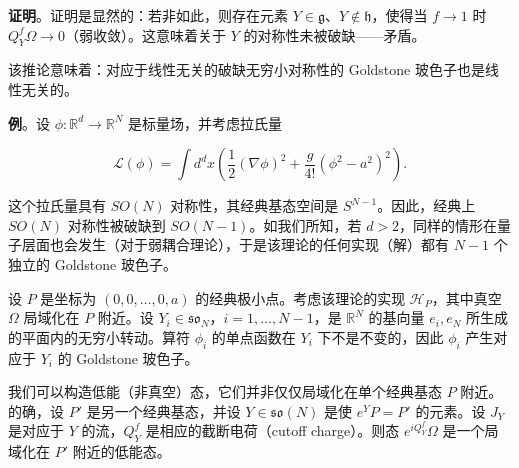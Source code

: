 \noindent\textbf{证明}。证明是显然的：若非如此，则存在元素 $Y\in\mathfrak{g}$、$Y\notin\mathfrak{h}$，使得当 $f\to1$ 时 $Q_Y^f\Omega\to0$（弱收敛）。这意味着关于 $Y$ 的对称性未被破缺——矛盾。


该推论意味着：对应于线性无关的破缺无穷小对称性的 Goldstone 玻色子也是线性无关的。

\noindent\textbf{例}。设 $\phi:\mathbb{R}^d\to\mathbb{R}^N$ 是标量场，并考虑拉氏量

\begin{equation}
  \tag{1.30}
  \label{eq:1-30}
  \mathcal{L}(\phi)=\int d^dx\left(\frac12(\nabla\phi)^2+\frac{g}{4!}(\phi^2-a^2)^2\right).
\end{equation}

这个拉氏量具有 $SO(N)$ 对称性，其经典基态空间是 $S^{N-1}$。因此，经典上 $SO(N)$ 对称性被破缺到 $SO(N-1)$。如我们所知，若 $d>2$，同样的情形在量子层面也会发生（对于弱耦合理论），于是该理论的任何实现（解）都有 $N-1$ 个独立的 Goldstone 玻色子。

设 $P$ 是坐标为 $(0,0,\dots,0,a)$ 的经典极小点。考虑该理论的实现 $\mathcal{H}_P$，其中真空 $\Omega$ 局域化在 $P$ 附近。设 $Y_i\in\mathfrak{so}_N$，$i=1,\dots,N-1$，是 $\mathbb{R}^N$ 的基向量 $e_i,e_N$ 所生成的平面内的无穷小转动。算符 $\phi_i$ 的单点函数在 $Y_i$ 下不是不变的，因此 $\phi_i$ 产生对应于 $Y_i$ 的 Goldstone 玻色子。

我们可以构造低能（非真空）态，它们并非仅仅局域化在单个经典基态 $P$ 附近。的确，设 $P'$ 是另一个经典基态，并设 $Y\in\mathfrak{so}(N)$ 是使 $e^YP=P'$ 的元素。设 $J_Y$ 是对应于 $Y$ 的流，$Q_Y^f$ 是相应的截断电荷（cutoff charge）。则态 $e^{iQ_Y^f}\Omega$ 是一个局域化在 $P'$ 附近的低能态。

